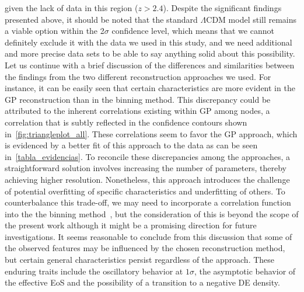 \documentclass[twocolumn,a4paper,reprint,amssymb,aps,prd,groupedaddress,superscriptaddress,nofootinbib]{revtex4-2}
\begin{document}
given the lack of data in this region ($z>2.4$). {Despite the significant findings presented above, it should be noted that the standard $\Lambda$CDM model still remains a viable option within the 2$\sigma$ confidence level, which means that we cannot definitely exclude it with the data we used in this study, and we need additional and more precise data sets to be able to say anything solid about this possibility.} {Let us continue with a brief discussion of the differences and similarities between the findings from the two different reconstruction approaches we used. For instance, it can be easily seen that certain characteristics are more evident in the GP reconstruction than in the binning method. This discrepancy could be attributed to the inherent correlations existing within GP among nodes, a correlation that is subtly reflected in the confidence contours shown in~\cref{fig:triangleplot_all}. These correlations seem to favor the GP approach, which is evidenced by a better fit of this approach to the data as can be seen in~\cref{tabla_evidencias}.
To reconcile these discrepancies among the approaches, a straightforward solution involves increasing the number of parameters, thereby achieving higher resolution. Nonetheless, this approach introduces the challenge of potential overfitting of specific characteristics and underfitting of others.
To counterbalance this trade-off, we may need to incorporate a correlation function into the the binning method~\cite{zhao2017dynamical,Escamilla:2021uoj}, but the consideration of this is beyond the scope of the present work although it might be a promising direction for future investigations. It seems reasonable to conclude from this discussion that some of the observed features may be influenced by the chosen reconstruction method, but certain general characteristics persist regardless of the approach.
These enduring traits include the oscillatory behavior at $1\sigma$, the asymptotic behavior of the effective EoS and the possibility of a transition to a negative DE density.}
\end{document}

